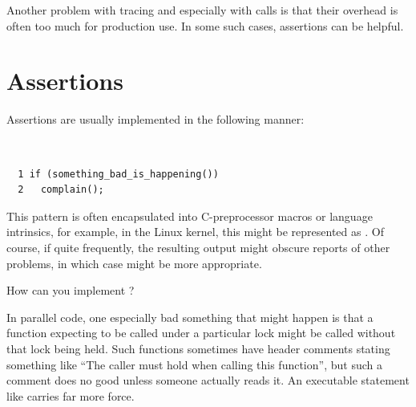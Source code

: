 Another problem with tracing and especially with  calls
is that their overhead is often too much for production use.
In some such cases, assertions can be helpful.

\section{Assertions}
\label{sec:debugging:Assertions}

Assertions are usually implemented in the following manner:

\vspace{5pt}
\begin{minipage}[t]{\columnwidth}
\tt
\scriptsize
\begin{verbatim}
  1 if (something_bad_is_happening())
  2   complain();
\end{verbatim}
\end{minipage}
\vspace{5pt}

This pattern is often encapsulated into C-preprocessor macros or
language intrinsics, for example, in the Linux kernel, this might
be represented as .
Of course, if  quite frequently,
the resulting output might obscure reports of other problems,
in which case
 might be more appropriate.

\QuickQuiz{}
	How can you implement ?
 \QuickQuizEnd

In parallel code, one especially bad something that might happen is that
a function expecting to be called under a particular lock might be called
without that lock being held.
Such functions sometimes have header comments stating something like
``The caller must hold  when calling this function'', but
such a comment does no good unless someone actually reads it.
An executable statement like  carries far
more force.

